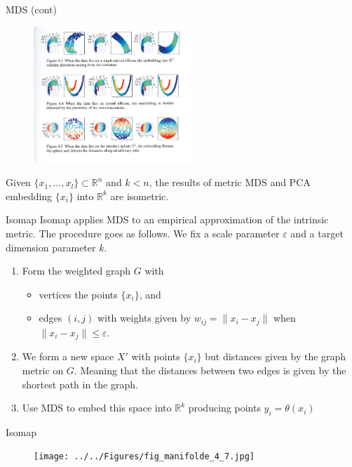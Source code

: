 \documentclass{beamer}
\begin{document}
\begin{frame}{MDS (cont)}

\begin{figure}[h]
	\centering
	\includegraphics[width=6cm]{../../Figures/fig_mds_manifold.png}
\end{figure}

\begin{theorem}
	Given $\{x_1, \ldots, x_l\}\subset \mathbb{R}^n$ and $k<n$, the results of metric MDS and PCA embedding $\{x_i\}$ into $\mathbb{R}^k$ are isometric.
\end{theorem}

\end{frame}


\begin{frame}{Isomap}
	Isomap applies MDS to an empirical approximation of the intrinsic metric.
	The procedure goes as follows. We fix a scale parameter $\varepsilon$ and a target dimension parameter $k$.
	
	\begin{enumerate}
		\item Form the weighted graph $G$ with
		\begin{itemize}
			\item vertices the points $\{x_i\}$, and
			\item edges $(i,j)$ with weights given by $w_{ij}=\| x_i -x_j\|$ when $\|x_i -x_j\| \le \varepsilon$.
		\end{itemize}
		\item We form a new space $X'$ with points $\{x_i\}$ but distances given by the graph metric on $G$.  Meaning that the distances between two edges is given by the shortest path in the graph.
		\item Use MDS to embed this space into $\mathbb{R}^k$ producing points $y_i = \theta(x_i)$
	\end{enumerate}
\end{frame}

\begin{frame}{Isomap}
	\begin{figure}[h]
		\centering
		\texttt{[image: ../../Figures/fig\_manifolde\_4\_7.jpg]}
	\end{figure}	
\end{frame}
\end{document}
